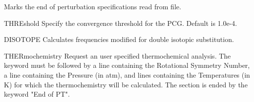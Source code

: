 \begin{keywordlist}
Marks the end of perturbation specifications read from   file.
\item[THREshold]
Specify the convergence threshold for the PCG. Default is 1.0e{}-4.
\item[DISOTOPE]
Calculates frequencies modified for double isotopic substitution.
\item[THERmochemistry]
Request an user specified thermochemical analysis.
The keyword must be followed by a line containing the Rotational Symmetry Number,
a line containing the Pressure (in atm), and lines containing the Temperatures (in K)
for which the thermochemistry will be calculated. The section is ended by the
keyword "End of PT".


\end{keywordlist}
